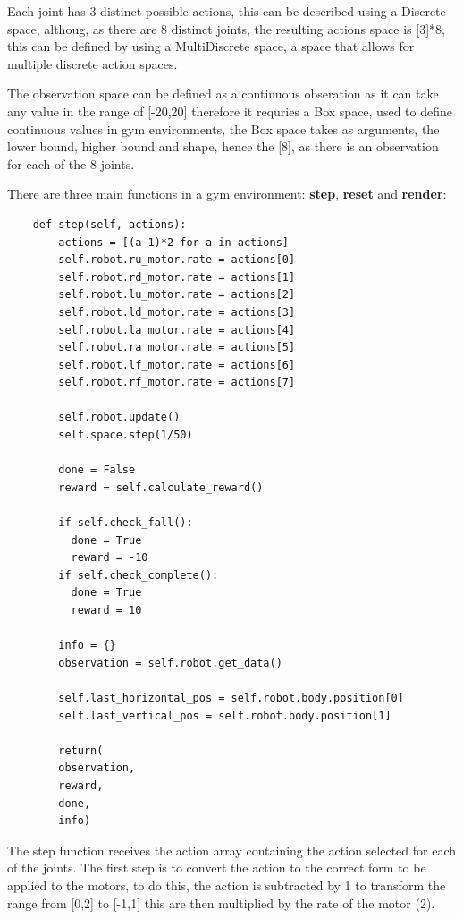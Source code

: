 Each joint has 3 distinct possible actions, this can be described using a Discrete space, althoug, as there are 8 distinct joints, the resulting actions space is [3]*8, this can be defined by using a MultiDiscrete space, a space that allows for multiple discrete action spaces.

The observation space can be defined as a continuous obseration as it can take any value in the range of [-20,20] therefore it requries a Box space, used to define continuous values in gym environments, the Box space takes as arguments, the lower bound, higher bound and shape, hence the [8], as there is an observation for each of the 8 joints.

There are three main functions in a gym environment: \textbf{step}, \textbf{reset} and \textbf{render}:

\lstset{language=Python}
\lstset{frame=lines}
\lstset{basicstyle=\footnotesize}
\begin{lstlisting}
    def step(self, actions):
        actions = [(a-1)*2 for a in actions]
        self.robot.ru_motor.rate = actions[0]
        self.robot.rd_motor.rate = actions[1]
        self.robot.lu_motor.rate = actions[2]
        self.robot.ld_motor.rate = actions[3]
        self.robot.la_motor.rate = actions[4]
        self.robot.ra_motor.rate = actions[5]
        self.robot.lf_motor.rate = actions[6]
        self.robot.rf_motor.rate = actions[7]

        self.robot.update()
        self.space.step(1/50)

        done = False
        reward = self.calculate_reward()

        if self.check_fall():
          done = True
          reward = -10 
        if self.check_complete(): 
          done = True  
          reward = 10

        info = {}
        observation = self.robot.get_data()

        self.last_horizontal_pos = self.robot.body.position[0]
        self.last_vertical_pos = self.robot.body.position[1]

        return(
        observation,
        reward,
        done,
        info)

\end{lstlisting}

The step function receives the action array containing the action selected for each of the joints.
The first step is to convert the action to the correct form to be applied to the motors, to do this, the action is subtracted by 1 to transform the range from [0,2] to [-1,1] this are then multiplied by the rate of the motor (2).

